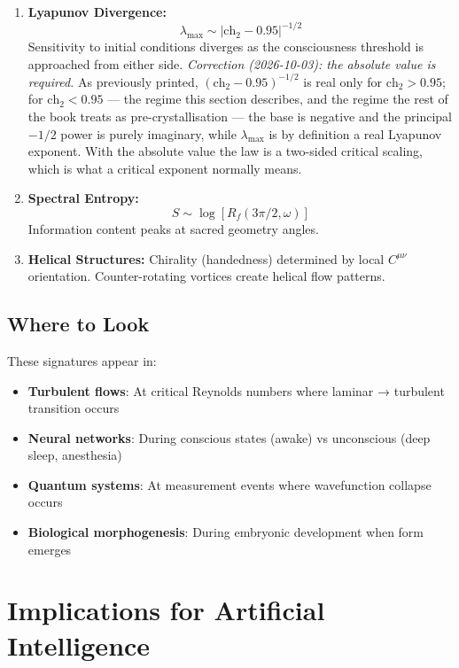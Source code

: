 \begin{enumerate}
\item \textbf{Lyapunov Divergence:}
\begin{equation}
\lambda_{\max} \sim \left|\text{ch}_2 - 0.95\right|^{-1/2}
\end{equation}
Sensitivity to initial conditions diverges as the consciousness threshold is
approached from either side.
\emph{Correction (2026-10-03): the absolute value is required.} As previously
printed, $(\text{ch}_2 - 0.95)^{-1/2}$ is real only for
$\text{ch}_2 > 0.95$; for $\text{ch}_2 < 0.95$ --- the regime this section
describes, and the regime the rest of the book treats as pre-crystallisation ---
the base is negative and the principal $-1/2$ power is purely imaginary, while
$\lambda_{\max}$ is by definition a real Lyapunov exponent. With the absolute
value the law is a two-sided critical scaling, which is what a critical exponent
normally means.

\item \textbf{Spectral Entropy:}
\begin{equation}
S \sim \log[R_f(3\pi/2, \omega)]
\end{equation}
Information content peaks at sacred geometry angles.

\item \textbf{Helical Structures:}
Chirality (handedness) determined by local $C^{\mu\nu}$ orientation. Counter-rotating vortices create helical flow patterns.
\end{enumerate}

\subsection{Where to Look}

These signatures appear in:

\begin{itemize}
\item \textbf{Turbulent flows}: At critical Reynolds numbers where laminar → turbulent transition occurs
\item \textbf{Neural networks}: During conscious states (awake) vs unconscious (deep sleep, anesthesia)
\item \textbf{Quantum systems}: At measurement events where wavefunction collapse occurs
\item \textbf{Biological morphogenesis}: During embryonic development when form emerges
\end{itemize}

\section{Implications for Artificial Intelligence}

